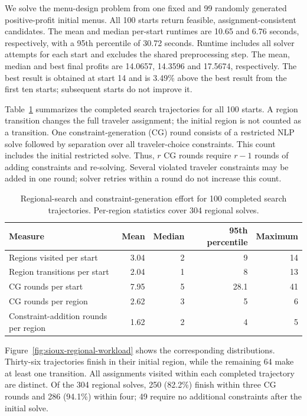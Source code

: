 \documentclass{article}
\begin{document}
We solve the menu-design problem from one fixed and 99 randomly
generated positive-profit initial menus. All 100 starts return feasible,
assignment-consistent candidates. The mean and median per-start
runtimes are 10.65 and 6.76 seconds, respectively, with a 95th
percentile of 30.72 seconds. Runtime includes all solver attempts for
each start and excludes the shared preprocessing step.
The mean, median and best final profits are 14.0657, 14.3596 and
17.5674, respectively. The best result is obtained at start 14 and is
3.49\% above the best result from the first ten starts; subsequent
starts do not improve it.

Table~\ref{tab:sioux-regional-workload} summarizes the completed search
trajectories for all 100 starts. A region transition changes the full
traveler assignment; the initial region is not counted as a transition.
One constraint-generation (CG) round consists of a restricted NLP solve followed by separation
over all traveler-choice constraints. This count includes the initial
restricted solve. Thus, $r$ CG rounds require $r-1$ rounds of adding
constraints and re-solving. Several violated traveler constraints may be
added in one round; solver retries within a round do not increase this
count.

\begin{table}[htbp]
    \centering
    \caption{Regional-search and constraint-generation effort for 100
    completed search trajectories. Per-region statistics cover 304 regional solves.}
    \label{tab:sioux-regional-workload}
    \small
    \begin{tabular}{lrrrr}
        \toprule
        Measure & Mean & Median & 95th percentile & Maximum \\
        \midrule
        Regions visited per start & 3.04 & 2 & 9 & 14 \\
        Region transitions per start & 2.04 & 1 & 8 & 13 \\
        CG rounds per start & 7.95 & 5 & 28.1 & 41 \\
        CG rounds per region & 2.62 & 3 & 5 & 6 \\
        Constraint-addition rounds per region & 1.62 & 2 & 4 & 5 \\
        \bottomrule
    \end{tabular}
\end{table}

Figure~\ref{fig:sioux-regional-workload} shows the corresponding
distributions. Thirty-six trajectories finish in their initial region,
while the remaining 64 make at least one transition. All assignments
visited within each completed trajectory are distinct. Of the 304
regional solves, 250 (82.2\%) finish within three CG rounds and 286
(94.1\%) within four; 49 require no additional constraints after the
initial solve.
\end{document}
